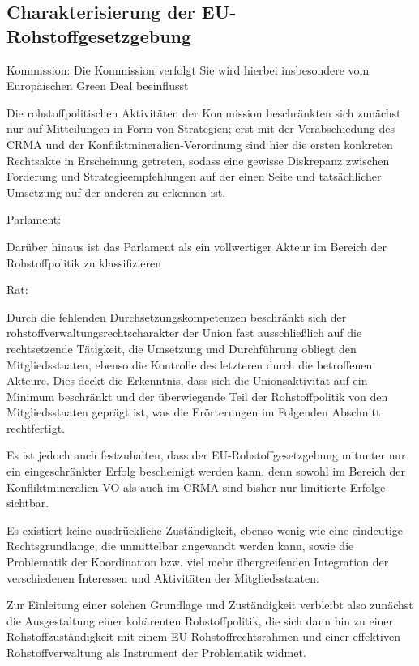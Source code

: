 \documentclass[12pt,a4paper,oneside]{book} %
\begin{document}
\subsection{Charakterisierung der EU-Rohstoffgesetzgebung}

Kommission: Die Kommission verfolgt 
Sie wird hierbei insbesondere vom Europäischen Green Deal beeinflusst

Die rohstoffpolitischen Aktivitäten der Kommission beschränkten sich zunächst nur auf Mitteilungen in Form von Strategien; erst mit der Verabschiedung des CRMA und der Konfliktmineralien-Verordnung sind hier die ersten konkreten Rechtsakte in Erscheinung getreten, sodass eine gewisse Diskrepanz zwischen Forderung und Strategieempfehlungen auf der einen Seite und tatsächlicher Umsetzung auf der anderen zu erkennen ist.

Parlament: 

Darüber hinaus ist das Parlament als ein vollwertiger Akteur im Bereich der Rohstoffpolitik zu klassifizieren

Rat:



Durch die fehlenden Durchsetzungskompetenzen beschränkt sich der rohstoffverwaltungsrechtscharakter der Union fast ausschließlich auf die rechtsetzende Tätigkeit, die Umsetzung und Durchführung obliegt den Mitgliedsstaaten, ebenso die Kontrolle des letzteren durch die betroffenen Akteure. Dies deckt die Erkenntnis, dass sich die Unionsaktivität auf ein Minimum beschränkt und der überwiegende Teil der Rohstoffpolitik von den Mitgliedsstaaten geprägt ist, was die Erörterungen im Folgenden Abschnitt rechtfertigt.

Es ist jedoch auch festzuhalten, dass der EU-Rohstoffgesetzgebung mitunter nur ein eingeschränkter Erfolg bescheinigt werden kann, denn sowohl im Bereich der Konfliktmineralien-VO als auch im CRMA sind bisher nur limitierte Erfolge sichtbar.

Es existiert keine ausdrückliche Zuständigkeit, ebenso wenig wie eine eindeutige Rechtsgrundlange, die unmittelbar angewandt werden kann, sowie die Problematik der Koordination bzw. viel mehr übergreifenden Integration der verschiedenen Interessen und Aktivitäten der Mitgliedsstaaten.

Zur Einleitung einer solchen Grundlage und Zuständigkeit verbleibt also zunächst die Ausgestaltung einer kohärenten Rohstoffpolitik, die sich dann hin zu einer Rohstoffzuständigkeit mit einem EU-Rohstoffrechtsrahmen und einer effektiven Rohstoffverwaltung als Instrument der Problematik widmet.
\end{document}
